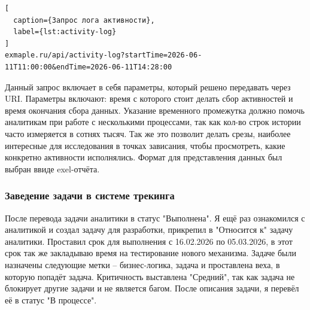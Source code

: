 \begin{lstlisting}[
  caption={Запрос лога активности},
  label={lst:activity-log}
]
exmaple.ru/api/activity-log?startTime=2026-06-11T11:00:00&endTime=2026-06-11T14:28:00
\end{lstlisting}

Данный запрос включает в себя параметры, который решено передавать через URI. 
Параметры включают: время с которого стоит делать сбор активностей и время окончания сбора данных.
Указание временного промежутка должно помочь аналитикам при работе с несколькими процессами, так как кол-во строк истории часто измеряется в сотнях тысяч. 
Так же это позволит делать срезы, наиболее интересные для исследования в точках зависания, чтобы просмотреть, какие конкретно активности исполнялись.
Формат для представления данных был выбран ввиде exel-отчёта.

\subsubsection{Заведение задачи в системе трекинга}
После перевода задачи аналитики в статус "Выполнена". 
Я ещё раз ознакомился с аналитикой и создал задачу для разработки, прикрепил в "Относится к" задачу аналитики. 
Проставил срок для выполнения с 16.02.2026 по 05.03.2026, в этот срок так же закладываю время на тестирование нового механизма. 
Задаче были назначены следующие метки -- бизнес-логика, задача и проставлена веха, в которую попадёт задача. 
Критичность выставлена "Средний", так как задача не блокирует другие задачи и не является багом.
После описания задачи, я перевёл её в статус "В процессе".

